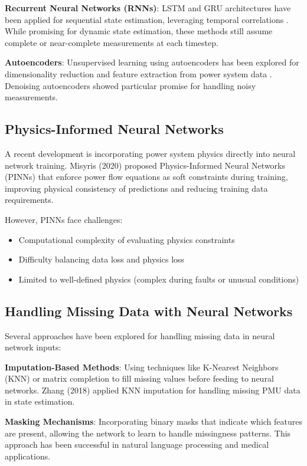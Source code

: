 \documentclass[12pt,a4paper]{report}
\begin{document}
\textbf{Recurrent Neural Networks (RNNs)}: LSTM and GRU architectures have been applied for sequential state estimation, leveraging temporal correlations \cite{fan2020}. While promising for dynamic state estimation, these methods still assume complete or near-complete measurements at each timestep.

\textbf{Autoencoders}: Unsupervised learning using autoencoders has been explored for dimensionality reduction and feature extraction from power system data \cite{yuan2019}. Denoising autoencoders showed particular promise for handling noisy measurements.

\subsection{Physics-Informed Neural Networks}

A recent development is incorporating power system physics directly into neural network training. Misyris (2020) proposed Physics-Informed Neural Networks (PINNs) that enforce power flow equations as soft constraints during training, improving physical consistency of predictions and reducing training data requirements.

However, PINNs face challenges:
\begin{itemize}
    \item Computational complexity of evaluating physics constraints
    \item Difficulty balancing data loss and physics loss
    \item Limited to well-defined physics (complex during faults or unusual conditions)
\end{itemize}

\subsection{Handling Missing Data with Neural Networks}

Several approaches have been explored for handling missing data in neural network inputs:

\textbf{Imputation-Based Methods}: Using techniques like K-Nearest Neighbors (KNN) or matrix completion to fill missing values before feeding to neural networks. Zhang (2018) applied KNN imputation for handling missing PMU data in state estimation.

\textbf{Masking Mechanisms}: Incorporating binary masks that indicate which features are present, allowing the network to learn to handle missingness patterns. This approach has been successful in natural language processing and medical applications.
\end{document}
